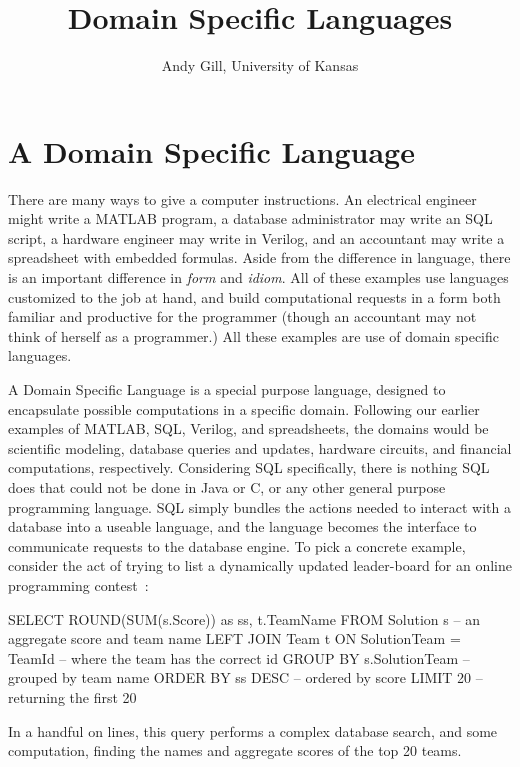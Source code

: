 \documentclass[11pt]{article}
\begin{document}
\title{Domain Specific Languages}
\author{Andy Gill, University of Kansas}
\maketitle

\section{A Domain Specific Language}

There are many ways to give a computer instructions.
%
An electrical engineer might write a MATLAB program,
a database administrator may write an SQL script,
a hardware engineer may write in Verilog,
and an accountant may write a spreadsheet
with embedded formulas.
%
Aside from the difference in language, there is an
important difference in {\em form\/} and {\em idiom\/}.
%
All of these examples use languages
customized to the job at hand, and build computational
requests in a form both familiar and productive
for the programmer (though an accountant may
not think of herself as a programmer.)
All these examples are use of domain specific languages.


A Domain Specific Language is a special purpose language,
designed to encapsulate possible computations in a specific
domain. Following our earlier examples of MATLAB, SQL,
Verilog, and spreadsheets, the domains would be scientific modeling,
database queries and updates, hardware circuits, and financial computations, respectively.
Considering SQL specifically, there is nothing SQL does that could not
be done in Java or C, or any other general purpose programming
language. SQL simply bundles the actions needed to
interact with a database into a useable language,
and the language becomes the interface to communicate requests
to the database engine.
To pick a concrete example,
consider the act of trying to list a dynamically updated leader-board
for an online programming contest~\cite{Gill:11:CatchingSat}:
\begin{Code}
SELECT ROUND(SUM(s.Score)) as ss, t.TeamName FROM Solution s -- an aggregate score and team name
   LEFT JOIN Team t ON SolutionTeam = TeamId                 -- where the team has the correct id
   GROUP BY s.SolutionTeam                                   -- grouped by team name
   ORDER BY ss DESC                                          -- ordered by score
   LIMIT 20                                                  -- returning the first 20
\end{Code}
In a handful on lines, this query performs a complex
database search, and some computation, finding
the names and aggregate scores of the top 20 teams.
\end{document}

